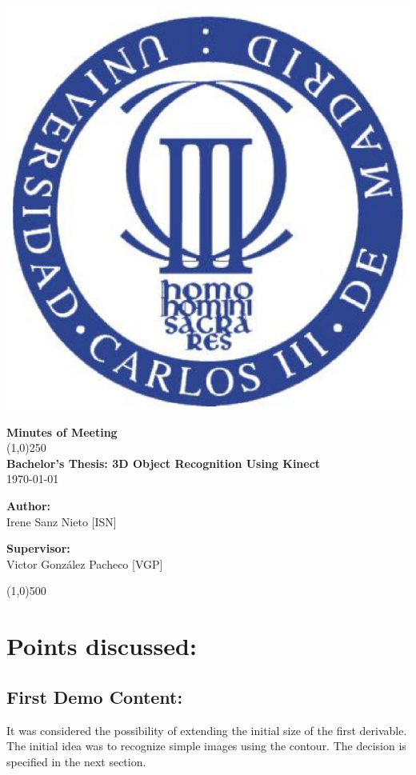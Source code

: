 \documentclass{article}
\newenvironment{myindentpar}[1]%
 {\begin{list}{}%
         {\setlength{\leftmargin}{#1}}%
         \item[]%
 }
 {\end{list}}
\begin{document}
\includegraphics[width=0.1\linewidth]{../template/uc3m.eps}


\vspace{-1cm}
\begin{minipage}[b]{1\linewidth}
	\begin{center}
	{\Huge \bfseries{Minutes of Meeting}}\\
	\line(1,0){250}\\[1cm]
	{\LARGE \textbf{Bachelor's Thesis: 3D Object Recognition Using Kinect}}\\[0.5cm]
	{\large \today}
	\end{center}
\end {minipage}



\begin{minipage}{0.55\textwidth}
\begin{flushleft} \large
\textbf{{Author:}\\}
Irene Sanz Nieto [ISN]\\
\end{flushleft}
\end{minipage}
\begin{minipage}{0.4\textwidth}
\begin{flushright} \large
\textbf{Supervisor: }\\
Victor González Pacheco [VGP]
\end{flushright}\end{minipage}

\begin{center}
\line(1,0){500}
\end{center}







\section{\LARGE Points discussed: }

		\subsection{First Demo Content:}
		\begin{myindentpar}{1cm}
		It was considered the possibility of extending the initial size of the first derivable. The initial idea was to recognize simple images using the contour. The decision is specified in the next section.
		\end{myindentpar}
\end{document}
